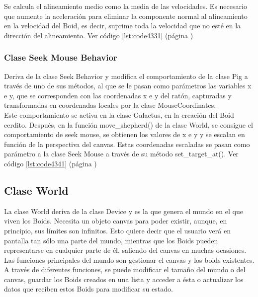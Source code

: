 Se calcula el alineamiento medio como la media de las velocidades. Es necesario que aumente la aceleración para eliminar la componente 
normal al alineamiento en la velocidad del Boid, es decir, suprime toda la velocidad que no esté en la dirección del alineamiento. 
Ver código \ref{lst:code4331} (página \pageref{lst:code4331})\\ %



\subsubsection{Clase Seek Mouse Behavior}
\label{subsubsection:seek_mouse_behavior}

Deriva de la clase Seek Behavior y modifica el comportamiento de la clase Pig a través de uno de sus métodos, al que se le pasan 
como parámetros las variables x e y, que se corresponden  con las coordenadas x e y del ratón, capturadas y transformadas en coordenadas 
locales por la clase MouseCoordinates.\\

Este comportamiento se activa en la clase Galactus, en la creación del Boid cerdito. Después, en la función move\_shepherd() de la clase 
World, se consigue el comportamiento de seek mouse, se obtienen los valores de x e y y se escalan en función de la perspectiva del canvas.
Estas coordenadas escaladas se pasan como parámetro a la clase Seek Mouse a través de su método  set\_target\_at(). 
Ver código \ref{lst:code4341} (página \pageref{lst:code4341})\\



\subsection{Clase World}
\label{subsection:world}

La clase World deriva de la clase Device y es la que genera el mundo en el que viven los Boids. Necesita un objeto canvas para poder 
existir, aunque, en principio, sus límites son infinitos. Esto quiere decir que el usuario verá en pantalla tan sólo una parte del mundo, 
mientras que los Boids pueden representarse en cualquier parte de él, saliendo del canvas en muchas ocasiones.\\

Las funciones principales del mundo son gestionar el canvas y los boids existentes. A través de diferentes funciones, se puede modificar 
el tamaño del mundo o del canvas, guardar los Boids creados en una lista y acceder a ésta o actualizar los datos que reciben estos Boids 
para modificar su estado.\\

